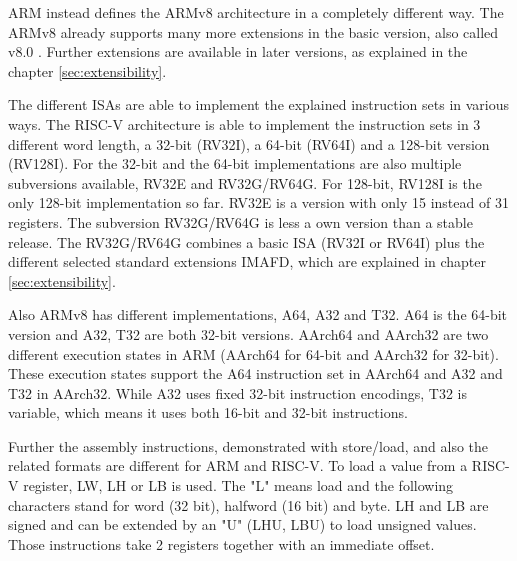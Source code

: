 \documentclass[conference]{IEEEtran}
\begin{document}
	ARM instead defines the ARMv8 architecture in a completely different way. The ARMv8 already supports many more extensions in the basic version, also called v8.0 \cite[page 60]{Arm2020}. Further extensions are available in later versions, as explained in the chapter \ref{sec:extensibility}.	

	The different \glspl{ISA} are able to implement the explained instruction sets in various ways.
	The RISC-V architecture is able to implement the instruction sets in 3 different word length, a 32-bit (RV32I), a 64-bit (RV64I) and a 128-bit version (RV128I).
	For the 32-bit and the 64-bit implementations are also multiple subversions available, RV32E and RV32G/RV64G. For 128-bit, RV128I is the only 128-bit implementation so far. RV32E is a version with only 15 instead of 31 registers. The subversion RV32G/RV64G is less a own version than a stable release. The RV32G/RV64G combines a basic \gls{ISA} (RV32I or RV64I) plus the different selected standard extensions IMAFD, which are explained in chapter \ref{sec:extensibility}. \cite[page 3ff]{Waterman2017} 

	Also ARMv8 has different implementations, A64, A32 and T32. A64 is the 64-bit version and A32, T32  are both 32-bit versions.
	AArch64 and AArch32 are two different execution states in ARM (AArch64 for 64-bit and AArch32 for 32-bit). These execution states support the A64 instruction set in AArch64 and A32 and T32 in AArch32. While A32 uses fixed 32-bit instruction encodings, T32 is variable, which means it uses both 16-bit and 32-bit instructions. \cite[page 38]{Arm2020}
	
	Further the assembly instructions, demonstrated with store/load, and also the related formats are different for ARM and RISC-V.
	To load a value from a RISC-V register, LW, LH or LB is used. The "L" means load and the following characters stand for word (32 bit), halfword (16 bit) and byte. LH and LB are signed and can be extended by an "U" (LHU, LBU) to load unsigned values. Those instructions take 2 registers together with an immediate offset. \cite[page 18f]{Waterman2017}
\end{document}
